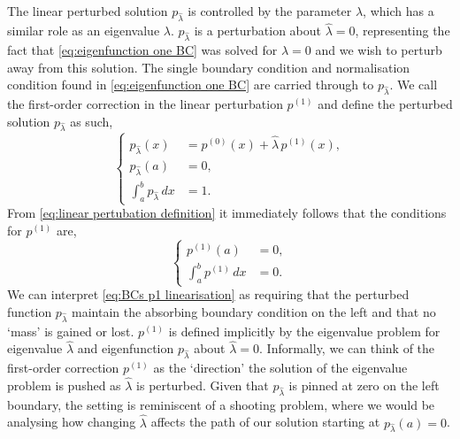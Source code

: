 \documentclass[11pt]{amsart}
\begin{document}
The linear perturbed solution $p_{\hat{\lambda}}$ is controlled by the parameter $\hat{\lambda}$, which has a similar role as an eigenvalue $\lambda$. $p_{\hat{\lambda}}$ is a perturbation about $\hat{\lambda}=0$, representing the fact that \cref{eq:eigenfunction one BC} was solved for $\lambda=0$ and we wish to perturb away from this solution. The single boundary condition and normalisation condition found in \cref{eq:eigenfunction one BC} are carried through to $p_{\hat{\lambda}}$. We call the first-order correction in the linear perturbation $p^{(1)}$ and define the perturbed solution $p_{\hat{\lambda}}$ as such,
\begin{equation}
\label{eq:linear pertubation definition}
    \left\{
\begin{aligned}
    p_{\hat{\lambda}}(x) & = p^{(0)}(x) + \hat{\lambda} \,p^{(1)}(x),\\
        p_{\hat{\lambda}}(a)&=0,\\
    \int_a^b p_{\hat{\lambda}}\,dx&=1.
\end{aligned}
    \right.
\end{equation}
From \cref{eq:linear pertubation definition} it immediately follows that the conditions for $p^{(1)}$ are,
\begin{equation}
    \label{eq:BCs p1 linearisation}
    \left\{
\begin{aligned}
        p^{(1)}(a)&=0,\\
    \int_a^bp^{(1)}\,dx&=0.
\end{aligned}
    \right.
\end{equation}
We can interpret \cref{eq:BCs p1 linearisation} as requiring that the perturbed function $p_{\hat{\lambda}}$ maintain the absorbing boundary condition on the left and that no `mass' is gained or lost. $p^{(1)}$ is defined implicitly by the eigenvalue problem for eigenvalue $\hat{\lambda}$ and eigenfunction $p_{\hat{\lambda}}$ about $\hat{\lambda}=0$. Informally, we can think of the first-order correction $p^{(1)}$ as the `direction' the solution of the eigenvalue problem is pushed as $\hat{\lambda}$ is perturbed. Given that $p_{\hat{\lambda}}$ is pinned at zero on the left boundary, the setting is reminiscent of a shooting problem, where we would be analysing how changing $\hat{\lambda}$ affects the path of our solution starting at $p_{\hat{\lambda}}(a)=0$.
\end{document}
